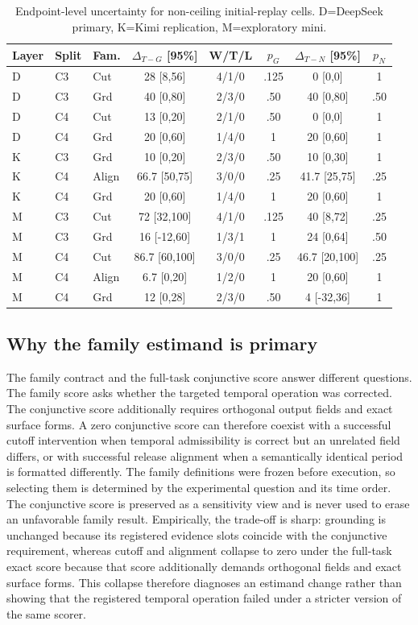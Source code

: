 \begin{table}[ht]
\centering
\scriptsize
\renewcommand{\arraystretch}{0.88}
\setlength{\tabcolsep}{2.0pt}
\begin{tabular}{lllccccc}
\toprule
Layer & Split & Fam. & $\Delta_{T-G}$ [95\%] & W/T/L & $p_G$ & $\Delta_{T-N}$ [95\%] & $p_N$ \\
\midrule
D & C3 & Cut & 28 [8,56] & 4/1/0 & .125 & 0 [0,0] & 1 \\
D & C3 & Grd & 40 [0,80] & 2/3/0 & .50 & 40 [0,80] & .50 \\
D & C4 & Cut & 13 [0,20] & 2/1/0 & .50 & 0 [0,0] & 1 \\
D & C4 & Grd & 20 [0,60] & 1/4/0 & 1 & 20 [0,60] & 1 \\
K & C3 & Grd & 10 [0,20] & 2/3/0 & .50 & 10 [0,30] & 1 \\
K & C4 & Align & 66.7 [50,75] & 3/0/0 & .25 & 41.7 [25,75] & .25 \\
K & C4 & Grd & 20 [0,60] & 1/4/0 & 1 & 20 [0,60] & 1 \\
M & C3 & Cut & 72 [32,100] & 4/1/0 & .125 & 40 [8,72] & .25 \\
M & C3 & Grd & 16 [-12,60] & 1/3/1 & 1 & 24 [0,64] & .50 \\
M & C4 & Cut & 86.7 [60,100] & 3/0/0 & .25 & 46.7 [20,100] & .25 \\
M & C4 & Align & 6.7 [0,20] & 1/2/0 & 1 & 20 [0,60] & 1 \\
M & C4 & Grd & 12 [0,28] & 2/3/0 & .50 & 4 [-32,36] & 1 \\
\bottomrule
\end{tabular}
\caption{Endpoint-level uncertainty for non-ceiling initial-replay cells. D=DeepSeek primary, K=Kimi replication, M=exploratory mini.}
\label{tab:endpointunc}
\end{table}

\subsection{Why the family estimand is primary}
The family contract and the full-task conjunctive score answer different questions. The family score asks whether the targeted temporal operation was corrected. The conjunctive score additionally requires orthogonal output fields and exact surface forms. A zero conjunctive score can therefore coexist with a successful cutoff intervention when temporal admissibility is correct but an unrelated field differs, or with successful release alignment when a semantically identical period is formatted differently. The family definitions were frozen before execution, so selecting them is determined by the experimental question and its time order. The conjunctive score is preserved as a sensitivity view and is never used to erase an unfavorable family result. Empirically, the trade-off is sharp: grounding is unchanged because its registered evidence slots coincide with the conjunctive requirement, whereas cutoff and alignment collapse to zero under the full-task exact score because that score additionally demands orthogonal fields and exact surface forms. This collapse therefore diagnoses an estimand change rather than showing that the registered temporal operation failed under a stricter version of the same scorer.

